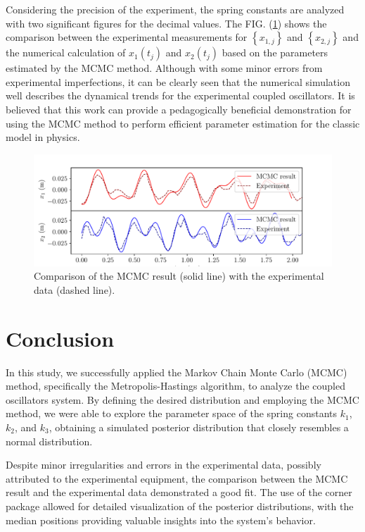 \documentclass[12pt, a4paper, reprint, nofootinbib, twoside,  showkeys]{revtex4-1}
\begin{document}
Considering the precision of the experiment, the spring constants are analyzed with two significant figures for the decimal values. The FIG. (\ref{fig:position_compare}) shows the comparison between the experimental measurements for $\left\{x_{1,j}\right\}$ and $\left\{x_{2,j}\right\}$ and the numerical calculation of $x_1\left(t_j\right)$ and $x_2\left(t_j\right)$ based on the parameters estimated by the MCMC method. Although with some minor errors from experimental imperfections, it can be clearly seen that the numerical simulation well describes the dynamical trends for the experimental coupled oscillators. It is believed that this work can provide a pedagogically beneficial demonstration for using the MCMC method to perform efficient parameter estimation for the classic model in physics.
\begin{figure}[h]
\centering
\includegraphics[width=\linewidth]{image/position_compare.pdf}
\caption{Comparison of the MCMC result (solid line) with the experimental data (dashed line).}
\label{fig:position_compare}
\end{figure}

\section{Conclusion}
In this study, we successfully applied the Markov Chain Monte Carlo (MCMC) method, specifically the Metropolis-Hastings algorithm, to analyze the coupled oscillators system. By defining the desired distribution and employing the MCMC method, we were able to explore the parameter space of the spring constants $k_1$, $k_2$, and $k_3$, obtaining a simulated posterior distribution that closely resembles a normal distribution.

Despite minor irregularities and errors in the experimental data, possibly attributed to the experimental equipment, the comparison between the MCMC result and the experimental data demonstrated a good fit. The use of the corner package allowed for detailed visualization of the posterior distributions, with the median positions providing valuable insights into the system's behavior.
\end{document}
